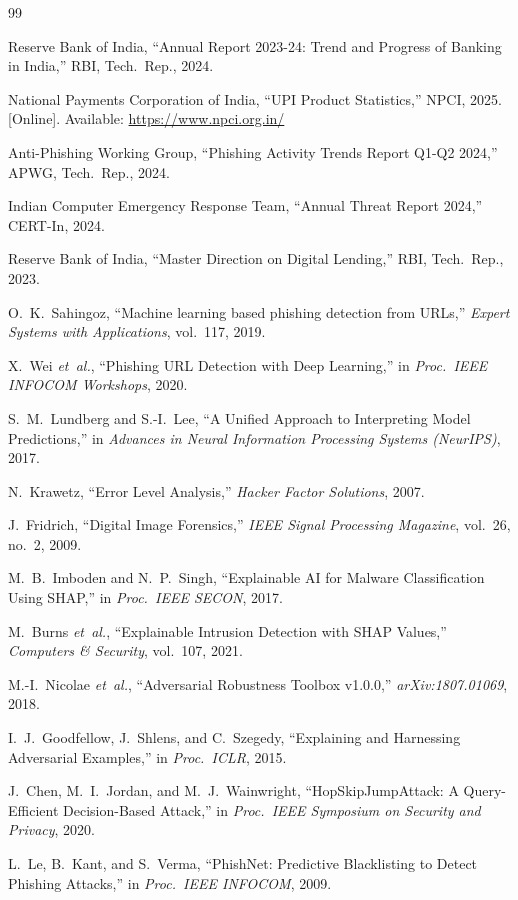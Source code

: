 \documentclass[conference]{IEEEtran}
\begin{document}
\begin{thebibliography}{99}

Reserve Bank of India, ``Annual Report 2023-24: Trend and Progress of
Banking in India,'' RBI, Tech.\ Rep., 2024.

National Payments Corporation of India, ``UPI Product Statistics,''
NPCI, 2025. [Online]. Available: \url{https://www.npci.org.in/}

Anti-Phishing Working Group, ``Phishing Activity Trends Report Q1-Q2
2024,'' APWG, Tech.\ Rep., 2024.

Indian Computer Emergency Response Team, ``Annual Threat Report
2024,'' CERT-In, 2024.

Reserve Bank of India, ``Master Direction on Digital Lending,'' RBI,
Tech.\ Rep., 2023.

O.\ K.\ Sahingoz, ``Machine learning based phishing detection from
URLs,'' \emph{Expert Systems with Applications}, vol.\ 117, 2019.

X.\ Wei \emph{et~al.}, ``Phishing URL Detection with Deep Learning,''
in \emph{Proc.\ IEEE INFOCOM Workshops}, 2020.

S.\ M.\ Lundberg and S.-I.\ Lee, ``A Unified Approach to Interpreting
Model Predictions,'' in \emph{Advances in Neural Information Processing
Systems (NeurIPS)}, 2017.

N.\ Krawetz, ``Error Level Analysis,'' \emph{Hacker Factor Solutions},
2007.

J.\ Fridrich, ``Digital Image Forensics,'' \emph{IEEE Signal Processing
Magazine}, vol.\ 26, no.\ 2, 2009.

M.\ B.\ Imboden and N.\ P.\ Singh, ``Explainable AI for Malware
Classification Using SHAP,'' in \emph{Proc.\ IEEE SECON}, 2017.

M.\ Burns \emph{et~al.}, ``Explainable Intrusion Detection with SHAP
Values,'' \emph{Computers \& Security}, vol.\ 107, 2021.

M.-I.\ Nicolae \emph{et~al.}, ``Adversarial Robustness Toolbox
v1.0.0,'' \emph{arXiv:1807.01069}, 2018.

I.\ J.\ Goodfellow, J.\ Shlens, and C.\ Szegedy, ``Explaining and
Harnessing Adversarial Examples,'' in \emph{Proc.\ ICLR}, 2015.

J.\ Chen, M.\ I.\ Jordan, and M.\ J.\ Wainwright, ``HopSkipJumpAttack:
A Query-Efficient Decision-Based Attack,'' in \emph{Proc.\ IEEE
Symposium on Security and Privacy}, 2020.

L.\ Le, B.\ Kant, and S.\ Verma, ``PhishNet: Predictive Blacklisting
to Detect Phishing Attacks,'' in \emph{Proc.\ IEEE INFOCOM}, 2009.

\end{thebibliography}
\end{document}
